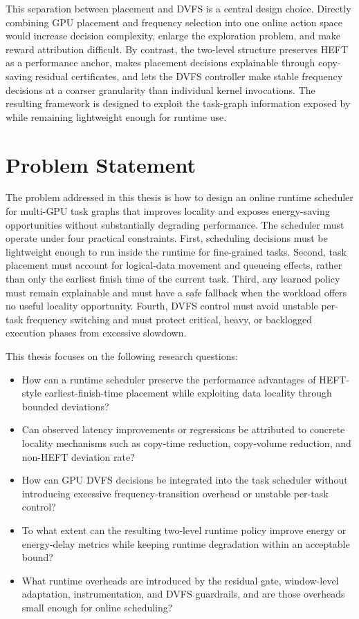 This separation between placement and DVFS is a central design choice. Directly combining GPU placement and frequency selection into one online action space would increase decision complexity, enlarge the exploration problem, and make reward attribution difficult. By contrast, the two-level structure preserves HEFT as a performance anchor, makes placement decisions explainable through copy-saving residual certificates, and lets the DVFS controller make stable frequency decisions at a coarser granularity than individual kernel invocations. The resulting framework is designed to exploit the task-graph information exposed by \CUDASTF{} while remaining lightweight enough for runtime use.

\section{Problem Statement}

The problem addressed in this thesis is how to design an online runtime scheduler for multi-GPU task graphs that improves locality and exposes energy-saving opportunities without substantially degrading performance. The scheduler must operate under four practical constraints. First, scheduling decisions must be lightweight enough to run inside the \CUDASTF{} runtime for fine-grained tasks. Second, task placement must account for logical-data movement and queueing effects, rather than only the earliest finish time of the current task. Third, any learned policy must remain explainable and must have a safe fallback when the workload offers no useful locality opportunity. Fourth, DVFS control must avoid unstable per-task frequency switching and must protect critical, heavy, or backlogged execution phases from excessive slowdown.

This thesis focuses on the following research questions:

\begin{itemize}
    \item How can a \CUDASTF{} runtime scheduler preserve the performance advantages of HEFT-style earliest-finish-time placement while exploiting data locality through bounded deviations?
    \item Can observed latency improvements or regressions be attributed to concrete locality mechanisms such as copy-time reduction, copy-volume reduction, and non-HEFT deviation rate?
    \item How can GPU DVFS decisions be integrated into the task scheduler without introducing excessive frequency-transition overhead or unstable per-task control?
    \item To what extent can the resulting two-level runtime policy improve energy or energy-delay metrics while keeping runtime degradation within an acceptable bound?
    \item What runtime overheads are introduced by the residual gate, window-level adaptation, instrumentation, and DVFS guardrails, and are those overheads small enough for online scheduling?
\end{itemize}

